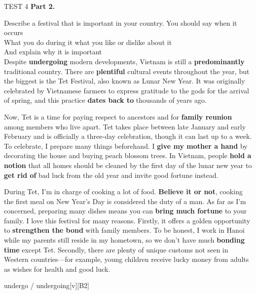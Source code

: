 \begin{glossarymc}[Cambridge 5]
\begin{test}{TEST 4}
    \noindent
    \textbf{Part 2.}
    \begin{qa}{Describe a festival that is important in your country.}
    You should say when it occurs\\
    What you do during it what you like or dislike about it\\
    And explain why it is important\\

    Despite \textbf{undergoing} modern developments, Vietnam is still a \textbf{predominantly} traditional country. There are \textbf{plentiful} cultural events throughout the year, but the biggest is the Tet Festival, also known as Lunar New Year. It was originally celebrated by Vietnamese farmers to express gratitude to the gods for the arrival of spring, and this practice \textbf{dates back to} thousands of years ago.

    Now, Tet is a time for paying respect to ancestors and for \textbf{family reunion} among members who live apart. Tet takes place between late January and early February and is officially a three-day celebration, though it can last up to a week. To celebrate, I prepare many things beforehand. I \textbf{give my mother a hand} by decorating the house and buying peach blossom trees. In Vietnam, people \textbf{hold a notion} that all homes should be cleaned by the first day of the lunar new year to \textbf{get rid of} bad luck from the old year and invite good fortune instead.

    During Tet, I’m in charge of cooking a lot of food. \textbf{Believe it or not}, cooking the first meal on New Year’s Day is considered the duty of a man. As far as I’m concerned, preparing many dishes means you can \textbf{bring much fortune} to your family. I love this festival for many reasons. Firstly, it offers a golden opportunity to \textbf{strengthen the bond} with family members. To be honest, I work in Hanoi while my parents still reside in my hometown, so we don’t have much \textbf{bonding time} except Tet. Secondly, there are plenty of unique customs not seen in Western countries—for example, young children receive lucky money from adults as wishes for health and good luck.
    \end{qa}

        \begin{VocabExplain}[Part 2]
            \begin{ExplainCard}{undergo / undergoing}[v][B2]
            \end{ExplainCard}


\end{VocabExplain}
\end{test}
\end{glossarymc}
